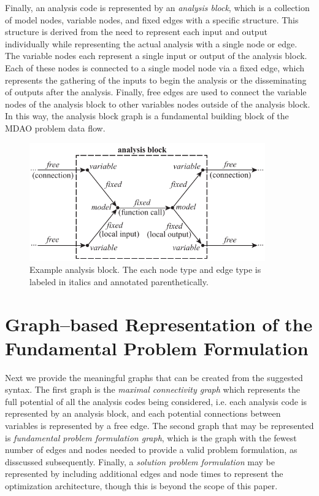 Finally, an analysis code is represented by an \emph{analysis block}, which is a collection of model nodes, variable nodes, and fixed edges with a specific structure. This structure is derived from the need to represent each input and output individually while representing the actual analysis with a single node or edge. The variable nodes each represent a single input or output of the analysis block. Each of these nodes is connected to a single model node via a fixed edge, which represents the gathering of the inputs to begin the analysis or the disseminating of outputs after the analysis. Finally, free edges are used to connect the variable nodes of the analysis block to other variables nodes outside of the analysis block. In this way, the analysis block graph is a fundamental building block of the MDAO problem data flow.
\begin{figure}[htb!]
	\begin{center}
	\includegraphics[width=4in]{images/analysis_block}
	\end{center}
	\vspace{-10pt}
\caption{Example analysis block. The each node type and edge type is labeled in italics and annotated parenthetically.}
\label{f:analysis block}
\end{figure}

\section{Graph--based Representation of the Fundamental Problem Formulation}
Next we provide the meaningful graphs that can be created from the suggested syntax. The first graph is the \emph{maximal connectivity graph} which represents the full potential of all the analysis codes being considered, i.e. each analysis code is represented by an analysis block, and each potential connections between variables is represented by a free edge. The second graph that may be represented is \emph{fundamental problem formulation graph}, which is the graph with the fewest number of edges and nodes needed to provide a valid problem formulation, as disscussed subsequently. Finally, a \emph{solution problem formulation} may be represented by including additional edges and node times to represent the optimization architecture, though this is beyond the scope of this paper. 

